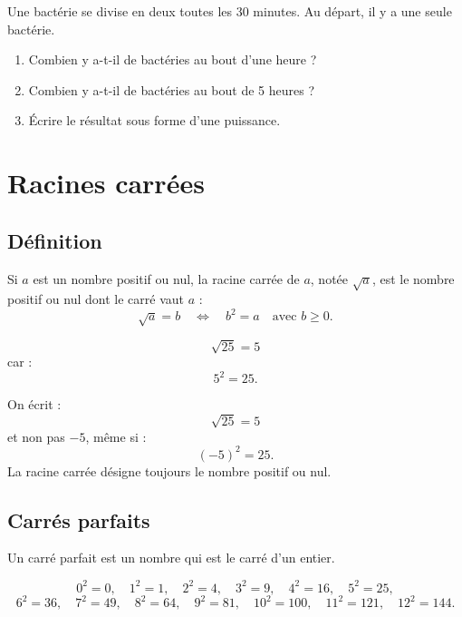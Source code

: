 \documentclass[11pt,a4paper]{article}
\newcounter{exercice}
\begin{document}
\begin{exercice}[Problème]
Une bactérie se divise en deux toutes les 30 minutes. Au départ, il y a une seule bactérie.
\begin{enumerate}
  \item Combien y a-t-il de bactéries au bout d'une heure ?
  \item Combien y a-t-il de bactéries au bout de 5 heures ?
  \item Écrire le résultat sous forme d'une puissance.
\end{enumerate}
\end{exercice}

\newpage

\section{Racines carrées}

\subsection{Définition}

\begin{definitionbox}
Si $a$ est un nombre positif ou nul, la racine carrée de $a$, notée $\sqrt{a}$, est le nombre positif ou nul dont le carré vaut $a$ :
\[
\sqrt{a}=b
\quad \Longleftrightarrow \quad
b^2=a
\quad \text{avec } b\geq0.
\]
\end{definitionbox}

\begin{exemple}
\[
\sqrt{25}=5
\]
car :
\[
5^2=25.
\]
\end{exemple}

\begin{attention}
On écrit :
\[
\sqrt{25}=5
\]
et non pas $-5$, même si :
\[
(-5)^2=25.
\]
La racine carrée désigne toujours le nombre positif ou nul.
\end{attention}

\subsection{Carrés parfaits}

\begin{definitionbox}
Un carré parfait est un nombre qui est le carré d'un entier.
\end{definitionbox}

\[
0^2=0,\quad
1^2=1,\quad
2^2=4,\quad
3^2=9,\quad
4^2=16,\quad
5^2=25,
\]
\[
6^2=36,\quad
7^2=49,\quad
8^2=64,\quad
9^2=81,\quad
10^2=100,\quad
11^2=121,\quad
12^2=144.
\]
\end{document}
